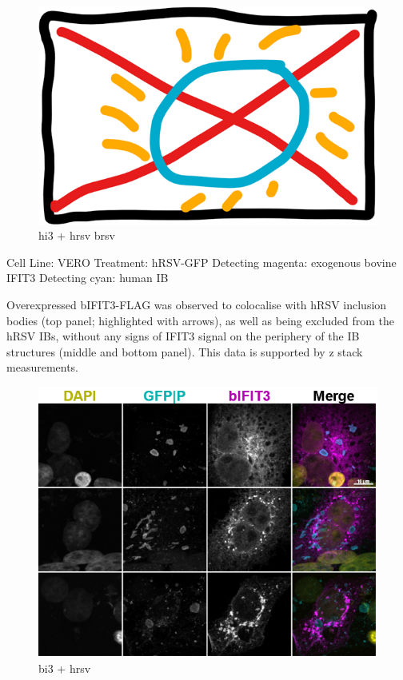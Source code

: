 \begin{figure}
    \centering
    \includegraphics[width=0.5\linewidth]{06. Chapter 1//Figs/00. placeholder.png}
    \caption[hi3 + hrsv brsv]{hi3 + hrsv brsv}
    \label{hi3 + hrsv brsv}
\end{figure}


Cell Line: VERO \newline
Treatment: hRSV-GFP \newline
Detecting magenta: exogenous bovine IFIT3 \newline
Detecting cyan: human IB \newline

Overexpressed bIFIT3-FLAG was observed to colocalise with hRSV inclusion bodies (top panel; highlighted with arrows), as well as being excluded from the hRSV IBs, without any signs of IFIT3 signal on the periphery of the IB structures (middle and bottom panel). This data is supported by z stack measurements.

\begin{figure}
    \centering
    \includegraphics[width=1\linewidth]{08. Chapter 3/Figs/04. IFIT3/05. bi3 hrsv.png}
    \caption[bi3 + hrsv]{bi3 + hrsv}
    \label{bi3 + hrsv}
\end{figure}

